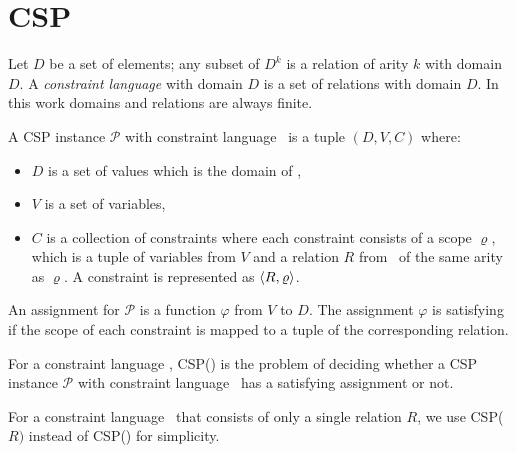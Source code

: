 \section{CSP} 
Let \(D\) be a set of elements; any subset of \(D^k\) is a relation of arity \(k\) with
domain \(D\)\@. A \emph{constraint language} with domain \(D\) is a set of
relations with domain \(D\)\@.
In this work domains and relations are always finite.

A CSP instance \(\mathcal{P}\) with constraint language \mrelset\ is a tuple 
\((D,V,C)\) where:
\begin{itemize}
\item \(D\) is a set of values which is the domain of \mrelset,
\item \(V\) is a set of variables,
\item \(C\) is a collection of constraints where each constraint consists of a scope \(\varrho\),
which is a tuple of variables from \(V\) and a relation \(R\) from \mrelset\
of the same arity as \(\varrho\)\@. A constraint is represented as \(\langle R, \varrho \rangle\)\@.
\end{itemize}

An assignment for \(\mathcal{P}\) is a function \(\varphi\) from \(V\) to \(D\)\@. The assignment
\(\varphi\) is satisfying if the scope of each constraint is
mapped to a tuple of the corresponding relation.

\begin{defi}
For a constraint language \mrelset, CSP(\mrelset) is the problem of deciding 
whether a CSP instance \(\mathcal{P}\) with constraint language \mrelset\
has a satisfying assignment or not.
\end{defi}

For a constraint language \mrelset\ that consists of only a single relation \(R\),
we use CSP(\(R)\) instead of CSP(\mrelset) for simplicity.

